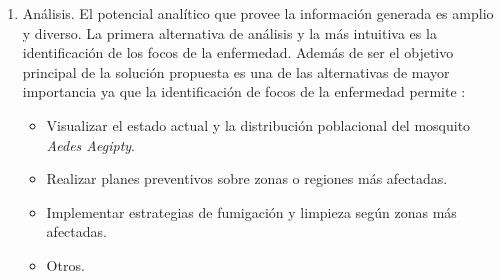 \begin{enumerate}[style=multiline,leftmargin=1.5cm]
    \item Análisis. El potencial analítico que provee la información generada es amplio y diverso. La primera alternativa de análisis y la más intuitiva es la identificación de los focos de la enfermedad. Además de ser el objetivo principal de la solución propuesta es una de las alternativas de mayor importancia ya que la identificación de focos de la enfermedad permite :
    \begin{itemize}
        \item Visualizar el estado actual y la distribución poblacional del mosquito \textit{Aedes Aegipty}.
        \item Realizar planes preventivos sobre zonas o regiones más afectadas.
        \item Implementar estrategias de fumigación y limpieza según zonas más afectadas.
        \item Otros.
    \end{itemize}
\end{enumerate}
